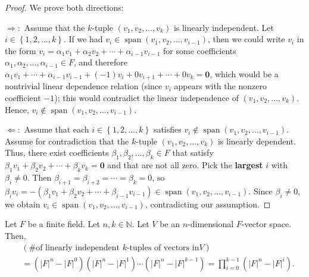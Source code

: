 \begin{proof}
\leanok
We prove both directions:

$\Longrightarrow:$ Assume that the $k$-tuple $\left(  v_{1}%
,v_{2},\ldots,v_{k}\right)  $ is linearly independent. Let $i\in\left\{
1,2,\ldots,k\right\}  $. If we had $v_{i}\in\operatorname{span}\left(
v_{1},v_{2},\ldots,v_{i-1}\right)  $, then we could write $v_{i}$ in the form
$v_{i}=\alpha_{1}v_{1}+\alpha_{2}v_{2}+\cdots+\alpha_{i-1}v_{i-1}$ for some
coefficients $\alpha_{1},\alpha_{2},\ldots,\alpha_{i-1}\in F$, and therefore
$\alpha_{1}v_{1}+\cdots+\alpha_{i-1}v_{i-1}+(-1)v_{i}+0v_{i+1}+\cdots+0v_{k}=\mathbf{0}$,
which would be a nontrivial linear dependence relation
(since $v_{i}$ appears with the nonzero coefficient $-1$);
this would contradict the linear
independence of $\left(  v_{1},v_{2},\ldots,v_{k}\right)  $. Hence,
$v_{i}\notin\operatorname{span}\left(  v_{1},v_{2},\ldots,v_{i-1}\right)$.

$\Longleftarrow:$ Assume that each $i\in\left\{  1,2,\ldots,k\right\}
$ satisfies $v_{i}\notin\operatorname{span}\left(  v_{1},v_{2},\ldots
,v_{i-1}\right)  $. Assume for contradiction that the $k$-tuple $\left(  v_{1}%
,v_{2},\ldots,v_{k}\right)  $ is linearly dependent. Thus, there
exist coefficients $\beta_{1},\beta_{2},\ldots,\beta_{k}\in F$ that satisfy
$\beta_{1}v_{1}+\beta_{2}v_{2}+\cdots+\beta_{k}v_{k}=\mathbf{0}$ and that are
not all zero.
Pick the \textbf{largest} $i$ with $\beta_{i}\neq0$. Then $\beta_{i+1}=\beta_{i+2}=\cdots=\beta_{k}=0$, so
$\beta_{i}v_{i} = -\left(  \beta_{1}v_{1}+\beta_{2}v_{2}+\cdots+\beta_{i-1}v_{i-1}\right)
\in\operatorname{span}\left(  v_{1},v_{2},\ldots,v_{i-1}\right)$.
Since $\beta_{i}\neq0$, we obtain $v_{i}\in\operatorname{span}\left(
v_{1},v_{2},\ldots,v_{i-1}\right)  $, contradicting our assumption.
\end{proof}

\begin{lemma}
\label{lem.pars.qbinom.lin-ind-count}
\leantarget
\leanok
Let $F$ be a finite field. Let
$n,k\in\mathbb{N}$. Let $V$ be an $n$-dimensional $F$-vector space. Then,
\begin{align*}
&  \left(  \text{\# of linearly independent }k\text{-tuples of vectors in
}V\right) \\
&  =\left(  \left\vert F\right\vert ^{n}-\left\vert F\right\vert ^{0}\right)
\left(  \left\vert F\right\vert ^{n}-\left\vert F\right\vert ^{1}\right)
\cdots\left(  \left\vert F\right\vert ^{n}-\left\vert F\right\vert
^{k-1}\right)  =\prod_{i=0}^{k-1}\left(  \left\vert F\right\vert
^{n}-\left\vert F\right\vert ^{i}\right)  .
\end{align*}
\end{lemma}

